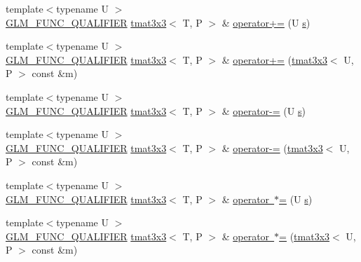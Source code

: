 \begin{DoxyCompactItemize}
{\footnotesize template$<$typename U $>$ }\\\mbox{\hyperlink{setup_8hpp_a33fdea6f91c5f834105f7415e2a64407}{G\+L\+M\+\_\+\+F\+U\+N\+C\+\_\+\+Q\+U\+A\+L\+I\+F\+I\+ER}} \mbox{\hyperlink{structglm_1_1tmat3x3}{tmat3x3}}$<$ T, P $>$ \& \mbox{\hyperlink{structglm_1_1tmat3x3_a217d0152118e3bb5f26da12641b5f48a}{operator+=}} (U \mbox{\hyperlink{glad_8h_af1b1d5edfea6a34daee7389b1b5810ad}{s}})
\item 
{\footnotesize template$<$typename U $>$ }\\\mbox{\hyperlink{setup_8hpp_a33fdea6f91c5f834105f7415e2a64407}{G\+L\+M\+\_\+\+F\+U\+N\+C\+\_\+\+Q\+U\+A\+L\+I\+F\+I\+ER}} \mbox{\hyperlink{structglm_1_1tmat3x3}{tmat3x3}}$<$ T, P $>$ \& \mbox{\hyperlink{structglm_1_1tmat3x3_a767f25ce5e8dfe01f93427ab11f66b68}{operator+=}} (\mbox{\hyperlink{structglm_1_1tmat3x3}{tmat3x3}}$<$ U, P $>$ const \&m)
\item 
{\footnotesize template$<$typename U $>$ }\\\mbox{\hyperlink{setup_8hpp_a33fdea6f91c5f834105f7415e2a64407}{G\+L\+M\+\_\+\+F\+U\+N\+C\+\_\+\+Q\+U\+A\+L\+I\+F\+I\+ER}} \mbox{\hyperlink{structglm_1_1tmat3x3}{tmat3x3}}$<$ T, P $>$ \& \mbox{\hyperlink{structglm_1_1tmat3x3_a166d5db3f6cf38eacecbe33437776c7a}{operator-\/=}} (U \mbox{\hyperlink{glad_8h_af1b1d5edfea6a34daee7389b1b5810ad}{s}})
\item 
{\footnotesize template$<$typename U $>$ }\\\mbox{\hyperlink{setup_8hpp_a33fdea6f91c5f834105f7415e2a64407}{G\+L\+M\+\_\+\+F\+U\+N\+C\+\_\+\+Q\+U\+A\+L\+I\+F\+I\+ER}} \mbox{\hyperlink{structglm_1_1tmat3x3}{tmat3x3}}$<$ T, P $>$ \& \mbox{\hyperlink{structglm_1_1tmat3x3_ad9a2afce6d4b6fe5945d6b76e4f41163}{operator-\/=}} (\mbox{\hyperlink{structglm_1_1tmat3x3}{tmat3x3}}$<$ U, P $>$ const \&m)
\item 
{\footnotesize template$<$typename U $>$ }\\\mbox{\hyperlink{setup_8hpp_a33fdea6f91c5f834105f7415e2a64407}{G\+L\+M\+\_\+\+F\+U\+N\+C\+\_\+\+Q\+U\+A\+L\+I\+F\+I\+ER}} \mbox{\hyperlink{structglm_1_1tmat3x3}{tmat3x3}}$<$ T, P $>$ \& \mbox{\hyperlink{structglm_1_1tmat3x3_ac3dbb7b3116c32325801f0d4a4d73cfe}{operator $\ast$=}} (U \mbox{\hyperlink{glad_8h_af1b1d5edfea6a34daee7389b1b5810ad}{s}})
\item 
{\footnotesize template$<$typename U $>$ }\\\mbox{\hyperlink{setup_8hpp_a33fdea6f91c5f834105f7415e2a64407}{G\+L\+M\+\_\+\+F\+U\+N\+C\+\_\+\+Q\+U\+A\+L\+I\+F\+I\+ER}} \mbox{\hyperlink{structglm_1_1tmat3x3}{tmat3x3}}$<$ T, P $>$ \& \mbox{\hyperlink{structglm_1_1tmat3x3_aa4636bb97bac71a3b76c9afadb364f47}{operator $\ast$=}} (\mbox{\hyperlink{structglm_1_1tmat3x3}{tmat3x3}}$<$ U, P $>$ const \&m)

\end{DoxyCompactItemize}
